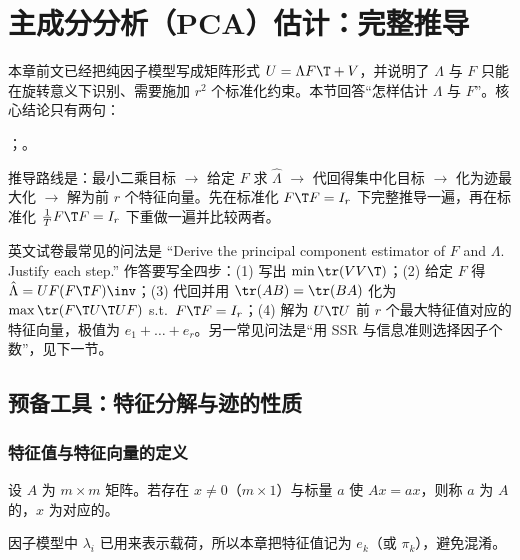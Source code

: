 \section{主成分分析（PCA）估计：完整推导}\label{sec:U13b-pca}

本章前文已经把纯因子模型写成矩阵形式 $U=\Lambda F\T+V$，并说明了 $\Lambda$ 与 $F$ 只能在旋转意义下识别、需要施加 $r^2$ 个标准化约束。本节回答“怎样估计 $\Lambda$ 与 $F$”。核心结论只有两句：
\begin{center}
；\qquad {}。
\end{center}
推导路线是：最小二乘目标 $\to$ 给定 $F$ 求 $\hat\Lambda$ $\to$ 代回得集中化目标 $\to$ 化为迹最大化 $\to$ 解为前 $r$ 个特征向量。先在标准化 $F\T F=I_r$ 下完整推导一遍，再在标准化 $\frac1T F\T F=I_r$ 下重做一遍并比较两者。

\begin{keypt}[本节的考法]
英文试卷最常见的问法是 “Derive the principal component estimator of $F$ and $\Lambda$. Justify each step.” 作答要写全四步：(1) 写出 $\min\tr(VV\T)$；(2) 给定 $F$ 得 $\hat\Lambda=UF(F\T F)\inv$；(3) 代回并用 $\tr(AB)=\tr(BA)$ 化为 $\max\tr(F\T U\T UF)$ s.t.\ $F\T F=I_r$；(4) 解为 $U\T U$ 前 $r$ 个最大特征值对应的特征向量，极值为 $e_1+\dots+e_r$。另一常见问法是“用 SSR 与信息准则选择因子个数”，见下一节。
\end{keypt}

\subsection{预备工具：特征分解与迹的性质}

\subsubsection{特征值与特征向量的定义}

\begin{defn}[特征值与特征向量]\label{def:U13b-eig}
设 $A$ 为 $m\times m$ 矩阵。若存在 $x\neq 0$（$m\times 1$）与标量 $a$ 使 $Ax=ax$，则称 $a$ 为 $A$ 的，$x$ 为对应的。
\end{defn}

因子模型中 $\lambda_i$ 已用来表示载荷，所以本章把特征值记为 $e_k$（或 $\pi_k$），避免混淆。

